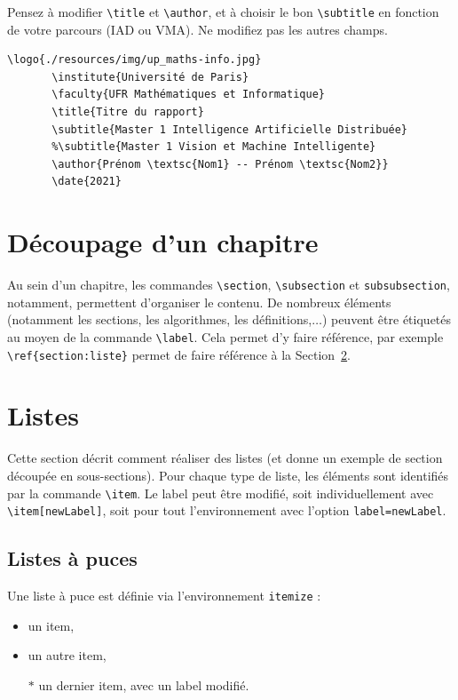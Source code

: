 \documentclass[a4paper, 12pt]{report}
\begin{document}
    Pensez à modifier \verb+\title+ et \verb+\author+, et à choisir le bon \verb+\subtitle+ en fonction de votre parcours (IAD ou VMA). Ne modifiez pas les autres champs.

    \begin{lstlisting}[style=latexFrameTB, caption={Code \LaTeX{} de la page de garde},gobble=7]
       \logo{./resources/img/up_maths-info.jpg}
       \institute{Université de Paris}
       \faculty{UFR Mathématiques et Informatique}
       \title{Titre du rapport}
       \subtitle{Master 1 Intelligence Artificielle Distribuée}
       %\subtitle{Master 1 Vision et Machine Intelligente}
       \author{Prénom \textsc{Nom1} -- Prénom \textsc{Nom2}}
       \date{2021}
    \end{lstlisting}

    
    \section{Découpage d'un chapitre}
    Au sein d'un chapitre, les commandes \verb+\section+, \verb+\subsection+ et \verb+subsubsection+, notamment, permettent d'organiser le contenu. De nombreux éléments (notamment les sections, les algorithmes, les définitions,$\dots$) peuvent être étiquetés au moyen de la commande \verb+\label+. Cela permet d'y faire référence, par exemple \verb+\ref{section:liste}+ permet de faire référence à la Section~\ref{section:liste}.
    
    \section{Listes}\label{section:liste}
    Cette section décrit comment réaliser des listes (et donne un exemple de section découpée en sous-sections). Pour chaque type de liste, les éléments sont identifiés par la commande \verb+\item+. Le label peut être modifié, soit individuellement avec \verb+\item[newLabel]+, soit pour tout l'environnement avec l'option \verb+label=newLabel+.
    
    
    \subsection{Listes à puces}
    Une liste à puce est définie via l'environnement \verb+itemize+ :
    \begin{itemize}
        \item un item,
        \item un autre item,
        \item[$*$] un dernier item, avec un label modifié.
    \end{itemize}
    
\end{document}

